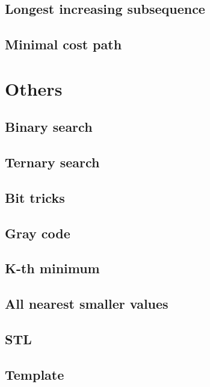 \documentclass[a4paper]{article}
\begin{document}
\begin{multicols*}{2}
    \subsection{Longest increasing subsequence}
        
    \subsection{Minimal cost path}
        

\section{Others}
    \subsection{Binary search}
        
    \subsection{Ternary search}
        
    \subsection{Bit tricks}
        
    \subsection{Gray code}
        
    \subsection{K-th minimum}
        
    \subsection{All nearest smaller values}
        
    \subsection{STL}
        
    \subsection{Template}
        

\end{multicols*}
\end{document}

